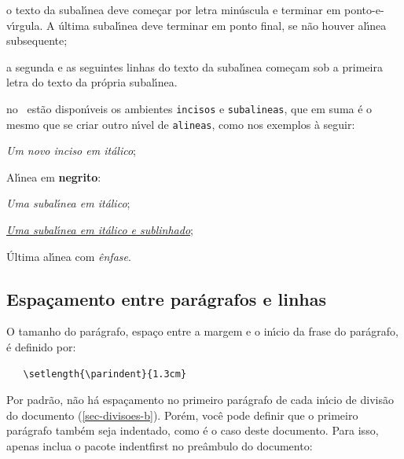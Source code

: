 \begin{alineas}
\begin{alineas}
     \item o texto da subal\'{\i}nea deve come\c{c}ar por letra min\'uscula e terminar em
     ponto-e-v\'{\i}rgula. A \'ultima subal\'{\i}nea deve terminar em ponto final, se n\~ao
     houver al\'{\i}nea subsequente;

     \item a segunda e as seguintes linhas do texto da subal\'{\i}nea come\c{c}am sob a
     primeira letra do texto da pr\'opria subal\'{\i}nea.
  \end{alineas}
  
  \item no \abnTeX\ est\~ao dispon\'{\i}veis os ambientes \texttt{incisos} e
  \texttt{subalineas}, que em suma \'e o mesmo que se criar outro n\'{\i}vel de
  \texttt{alineas}, como nos exemplos \`a seguir:
  
  \begin{incisos}
    \item \textit{Um novo inciso em it\'alico};
  \end{incisos}
  
  \item Al\'{\i}nea em \textbf{negrito}:
  
  \begin{subalineas}
    \item \textit{Uma subal\'{\i}nea em it\'alico};
    \item \underline{\textit{Uma subal\'{\i}nea em it\'alico e sublinhado}}; 
  \end{subalineas}
  
  \item \'Ultima al\'{\i}nea com \emph{\^enfase}.
  
\end{alineas}

\subsection{Espa\c{c}amento entre par\'agrafos e linhas}\label{sec_espacamento}

O tamanho do par\'agrafo, espa\c{c}o entre a margem
e o in\'{\i}cio da frase do par\'agrafo, \'e definido por:

\begin{verbatim}
   \setlength{\parindent}{1.3cm}
\end{verbatim}

Por padr\~ao, n\~ao h\'a espa\c{c}amento no
primeiro par\'agrafo de cada in\'{\i}cio de divis\~ao do documento
(\autoref{sec-divisoes-b}). Por\'em, voc\^e pode definir que o primeiro par\'agrafo
tamb\'em seja indentado, como \'e o caso deste documento. Para isso, apenas inclua o
pacote \textsf{indentfirst} no pre\^ambulo do documento:


